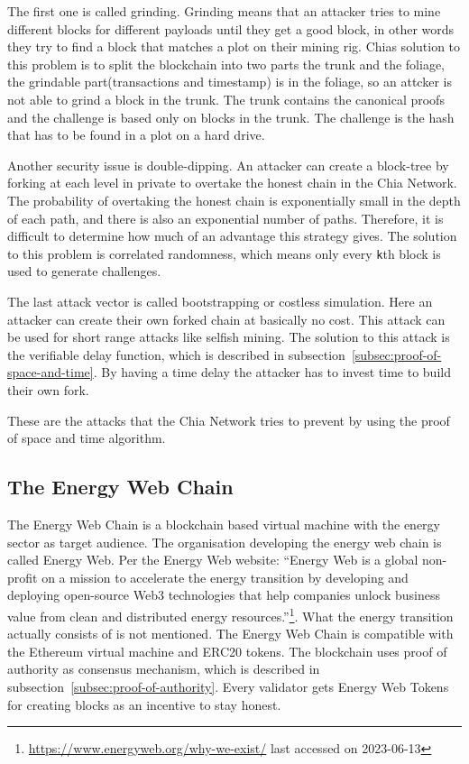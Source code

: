 The first one is called grinding.
Grinding means that an attacker tries to  mine different blocks for different payloads until they get a good block, in other words they try to find a block that matches a plot on their mining rig.
Chias solution to this problem is to split the blockchain into two parts the trunk and the foliage, the grindable part(transactions and timestamp) is in the foliage, so an attcker is not able to grind a block in the trunk.
The trunk contains the canonical proofs and the challenge is based only on blocks in the trunk.
The challenge is the hash that has to be found in a plot on a hard drive.

Another security issue is double-dipping.
An attacker can create a block-tree by forking at each level in private to overtake the honest chain in the Chia Network.
The probability of overtaking the honest chain is exponentially small in the depth of each path, and there is also an exponential number of paths.
Therefore, it is difficult to determine how much of an advantage this strategy gives.
The solution to this problem is correlated randomness, which means only every \texttt{k}th block is used to generate challenges.

The last attack vector is called bootstrapping or costless simulation.
Here an attacker can create their own forked chain at basically no cost.
This attack can be used for short range attacks like selfish mining.
The solution to this attack is the verifiable delay function, which is described in subsection\ \ref{subsec:proof-of-space-and-time}.
By having a time delay the attacker has to invest time to build their own fork.\cite{chia-greenpaper}

These are the attacks that the Chia Network tries to prevent by using the proof of space and time algorithm.


\subsection{The Energy Web Chain}\label{subsec:the-energy-web-chain}
The Energy Web Chain is a blockchain based virtual machine with the energy sector as target audience.
The organisation developing the energy web chain is called Energy Web.
Per the Energy Web website: ``Energy Web is a global non-profit on a mission to accelerate the energy transition by developing and deploying open-source Web3 technologies that help companies unlock business value from clean and distributed energy resources.''\footnote{\url{https://www.energyweb.org/why-we-exist/} last accessed on 2023-06-13}.
What the energy transition actually consists of is not mentioned.
The Energy Web Chain is compatible with the Ethereum virtual machine and ERC20 tokens.
The blockchain uses proof of authority as consensus mechanism, which is described in subsection\ \ref{subsec:proof-of-authority}.
Every validator gets Energy Web Tokens for creating blocks as an incentive to stay honest.\cite{kraken-ewc}

